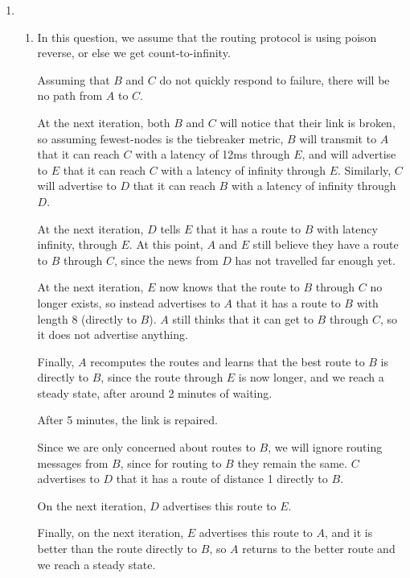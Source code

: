 


\begin{enumerate}[label=(\alph*)]

  \item
    \begin{enumerate}[label=(\roman*)]
      \item

        In this question, we assume that the routing protocol is using poison reverse, or else we get count-to-infinity.

        Assuming that $B$ and $C$ do not quickly respond to failure, there will be no path from $A$ to $C$.

        At the next iteration, both $B$ and $C$ will notice that their link is broken,  so assuming fewest-nodes is the tiebreaker metric, $B$ will transmit to $A$ that it can reach $C$ with a latency of 12ms through $E$, and will advertise to $E$ that it can reach $C$ with a latency of infinity through $E$. Similarly, $C$ will advertise to $D$ that it can reach $B$ with a latency of infinity through $D$.

        At the next iteration, $D$ tells $E$ that it has a route to $B$ with latency infinity, through $E$. At this point, $A$ and $E$ still believe they have a route to $B$ through $C$, since the news from $D$ has not travelled far enough yet.

        At the next iteration, $E$ now knows that the route to $B$ through $C$ no longer exists, so instead advertises to $A$ that it has a route to $B$ with length 8 (directly to $B$). $A$ still thinks that it can get to $B$ through $C$, so it does not advertise anything.

        Finally, $A$ recomputes the routes and learns that the best route to $B$ is directly to $B$, since the route through $E$ is now longer, and we reach a steady state, after around 2 minutes of waiting.

        After 5 minutes, the link is repaired.

        Since we are only concerned about routes to $B$, we will ignore routing messages from $B$, since for routing to $B$ they remain the same. $C$ advertises to $D$ that it has a route of distance 1 directly to $B$.

        On the next iteration, $D$ advertises this route to $E$.

        Finally, on the next iteration, $E$ advertises this route to $A$, and it is better than the route directly to $B$, so $A$ returns to the better route and we reach a steady state.


\end{enumerate}
\end{enumerate}
